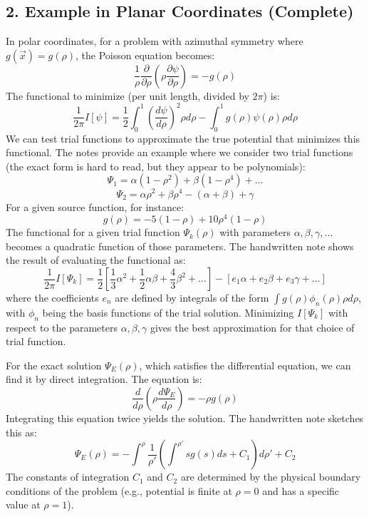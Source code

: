 \documentclass[12pt, a4paper]{article}
\begin{document}
	\subsection*{2. Example in Planar Coordinates (Complete)}
	In polar coordinates, for a problem with azimuthal symmetry where $g(\vec{x}) = g(\rho)$, the Poisson equation becomes:
	$$
	\frac{1}{\rho}\frac{\partial}{\partial\rho}\left(\rho\frac{\partial\psi}{\partial\rho}\right) = -g(\rho)
	$$
	The functional to minimize (per unit length, divided by $2\pi$) is:
	$$
	\frac{1}{2\pi} I[\psi] = \frac{1}{2} \int_0^1 \left(\frac{d\psi}{d\rho}\right)^2 \rho d\rho - \int_0^1 g(\rho) \psi(\rho) \rho d\rho
	$$
	We can test trial functions to approximate the true potential that minimizes this functional. The notes provide an example where we consider two trial functions (the exact form is hard to read, but they appear to be polynomials):
	$$
	\Psi_1 = \alpha(1-\rho^2) + \beta(1-\rho^4) + \dots
	$$
	$$
	\Psi_2 = \alpha\rho^2 + \beta\rho^4 - (\alpha+\beta) + \gamma
	$$
	For a given source function, for instance:
	$$
	g(\rho) = -5(1-\rho) + 10\rho^4(1-\rho)
	$$
	The functional for a given trial function $\Psi_k(\rho)$ with parameters $\alpha, \beta, \gamma, \dots$ becomes a quadratic function of those parameters. The handwritten note shows the result of evaluating the functional as:
	$$
	\frac{1}{2\pi} I[\Psi_k] = \frac{1}{2}\left[\frac{1}{3}\alpha^2 + \frac{1}{2}\alpha\beta + \frac{4}{3}\beta^2 + \dots\right] - [e_1\alpha + e_2\beta + e_3\gamma + \dots]
	$$
	where the coefficients $e_n$ are defined by integrals of the form $\int g(\rho) \phi_n(\rho) \rho d\rho$, with $\phi_n$ being the basis functions of the trial solution. Minimizing $I[\Psi_k]$ with respect to the parameters $\alpha, \beta, \gamma$ gives the best approximation for that choice of trial function.
	
	For the exact solution $\Psi_E(\rho)$, which satisfies the differential equation, we can find it by direct integration. The equation is:
	$$
	\frac{d}{d\rho}\left(\rho\frac{d\Psi_E}{d\rho}\right) = -\rho g(\rho)
	$$
	Integrating this equation twice yields the solution. The handwritten note sketches this as:
	$$
	\Psi_E(\rho) = - \int^{\rho} \frac{1}{\rho'} \left( \int^{\rho'} s g(s) ds + C_1 \right) d\rho' + C_2
	$$
	The constants of integration $C_1$ and $C_2$ are determined by the physical boundary conditions of the problem (e.g., potential is finite at $\rho=0$ and has a specific value at $\rho=1$).
	
\end{document}
